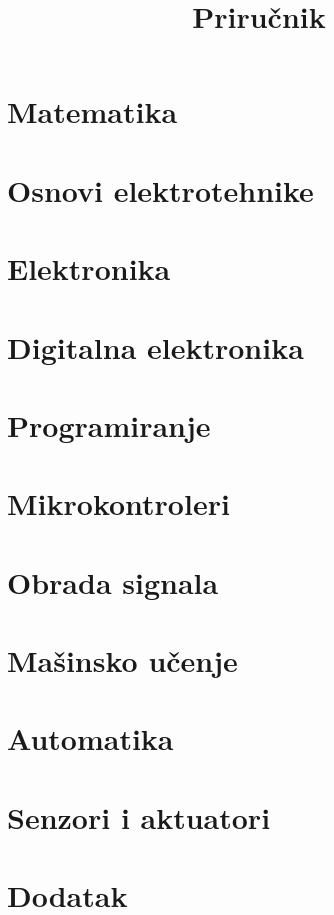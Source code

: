 \documentclass{book}
\title{Priru\v cnik}
\begin{document}
	\maketitle

	\tableofcontents
	
	\chapter{Matematika}
			
	
	\chapter{Osnovi elektrotehnike}
		
	
	\chapter{Elektronika}
		
	
	\chapter{Digitalna elektronika}
		
	
	\chapter{Programiranje}
		
	
	\chapter{Mikrokontroleri}
		
	
	\chapter{Obrada signala}
		
	
	\chapter{Ma\v sinsko u\v cenje}
		
	
	\chapter{Automatika}
		
	
	\chapter{Senzori i aktuatori}
		
	
	\chapter{Dodatak}
		
	
\end{document}
